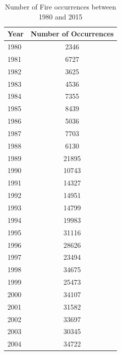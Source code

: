 \begin{table}[H]
	\caption{Number of Fire occurrences between 1980 and 2015}
	\label{number_occurrences_1980_2013}
	\centering
	\begin{tabular}{lc}
		\hline
		Year & \multicolumn{1}{l}{Number of Occurrences} \\ \hline
		1980 & 2346                                      \\
		1981 & 6727                                      \\
		1982 & 3625                                      \\
		1983 & 4536                                      \\
		1984 & 7355                                      \\
		1985 & 8439                                      \\
		1986 & 5036                                      \\
		1987 & 7703                                      \\
		1988 & 6130                                      \\
		1989 & 21895                                     \\
		1990 & 10743                                     \\
		1991 & 14327                                     \\
		1992 & 14951                                     \\
		1993 & 14799                                     \\
		1994 & 19983                                     \\
		1995 & 31116                                     \\
		1996 & 28626                                     \\
		1997 & 23494                                     \\
		1998 & 34675                                     \\
		1999 & 25473                                     \\
		2000 & 34107                                     \\
		2001 & 31582                                     \\
		2002 & 33697                                     \\
		2003 & 30345                                     \\
		2004 & 34722                                     \\

\end{tabular}
\end{table}
